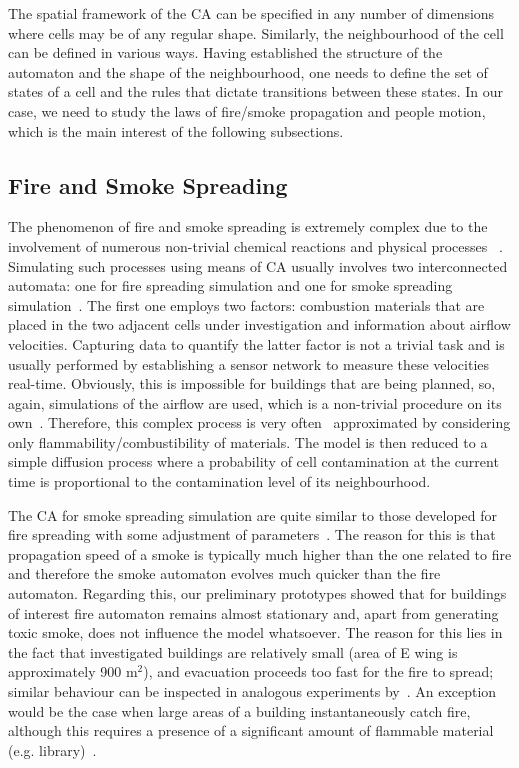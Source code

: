 The spatial framework of the CA can be specified in any number of dimensions
where cells may be of any regular shape.
Similarly, the neighbourhood of the cell can be defined in various ways.
Having established the structure of the automaton and the shape of the
neighbourhood, one needs to define the set of states of a cell and the rules
that dictate transitions between these states.
In our case, we need to study the laws of fire/smoke propagation and people
motion, which is the main interest of the following subsections.

\subsection{Fire and Smoke Spreading}
The phenomenon of fire and smoke spreading is extremely complex due to the
involvement of numerous non-trivial chemical reactions and physical processes
~\cite{Ying, Curiac}.
Simulating such processes using means of CA usually involves two interconnected
automata: one for fire spreading simulation and one for smoke spreading
simulation~\cite{Curiac}.
The first one employs two factors: combustion materials that are placed in the
two adjacent cells under investigation and information about airflow velocities.
Capturing data to quantify the latter factor is not a trivial task and is
usually performed by establishing a sensor network to measure these velocities
real-time.
Obviously, this is impossible for buildings that are being planned, so, again,
simulations of the airflow are used, which is a non-trivial procedure on its
own~\cite{Airflow}.
Therefore, this complex process is very often~\cite{Tissera1, Tissera2}
approximated by considering only flammability/combustibility of materials.
The model is then reduced to a simple diffusion process where a probability of
cell contamination at the current time is proportional to the contamination
level of its neighbourhood.

The CA for smoke spreading simulation are quite similar to those developed for
fire spreading with some adjustment of parameters~\cite{Curiac}.
The reason for this is that propagation speed of a smoke is typically much
higher than the one related to fire and therefore the smoke automaton evolves
much quicker than the fire automaton.
Regarding this, our preliminary prototypes showed that for buildings of
interest fire automaton remains almost stationary and, apart from generating
toxic smoke, does not influence the model whatsoever.
The reason for this lies in the fact that investigated buildings are relatively
small (area of E wing is approximately 900 m$^2$), and evacuation proceeds too
fast for the fire to spread; similar behaviour can be inspected in analogous
experiments by~\cite{Tissera1}.
An exception would be the case when large areas of a building instantaneously
catch fire, although this requires a presence of a significant amount of
flammable material (e.g. library)~\cite{Tissera2}.

